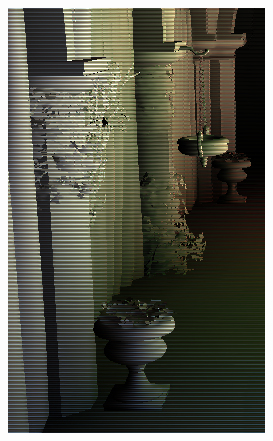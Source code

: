 \begin{figure}[htb]
\begin{subfigure}[b]{0.20\textwidth}
        \includegraphics[width=.95\textwidth]{screenshots/interleaved_horizontal_blur}
        \caption{}
        \label{fig:results:interleaved_horizontal_blur}
    \end{subfigure}%
    \begin{subfigure}[b]{0.20\textwidth}
        \centering

\end{subfigure}
\end{figure}
